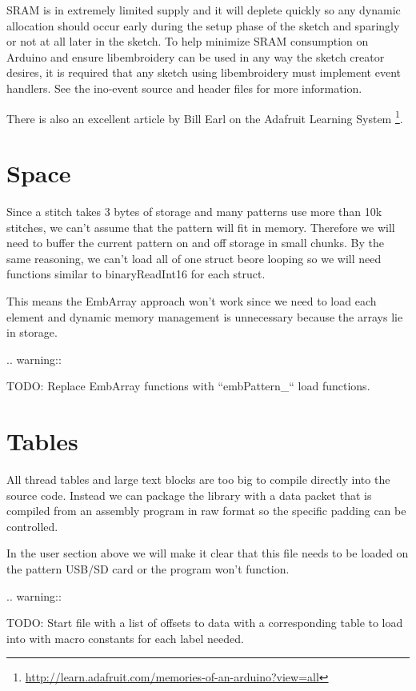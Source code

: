 \documentclass[11pt]{report}
\begin{document}
SRAM is in extremely limited supply and it will deplete quickly so any
dynamic allocation should occur early during the setup phase of the
sketch and sparingly or not at all later in the sketch. To help minimize
SRAM consumption on Arduino and ensure libembroidery can be used in any
way the sketch creator desires, it is required that any sketch using
libembroidery must implement event handlers. See the ino-event source
and header files for more information.

There is also an excellent article by Bill Earl on the Adafruit Learning
System
\footnote{\url{http://learn.adafruit.com/memories-of-an-arduino?view=all}}.

\section{Space}

Since a stitch takes 3 bytes of storage and many patterns use more than
10k stitches, we can't assume that the pattern will fit in memory. Therefore
we will need to buffer the current pattern on and off storage in small
chunks. By the same reasoning, we can't load all of one struct beore
looping so we will need functions similar to binaryReadInt16 for each
struct.

This means the EmbArray approach won't work since we need to load
each element and dynamic memory management is unnecessary because
the arrays lie in storage.

.. warning::

   TODO: Replace EmbArray functions with ``embPattern\_`` load functions.

\section{Tables}

All thread tables and large text blocks are too big to compile directly
into the source code. Instead we can package the library with a data packet
that is compiled from an assembly program in raw format so the specific
padding can be controlled.

In the user section above we will make it clear that this file
needs to be loaded on the pattern USB/SD card or the program won't function.

.. warning::

   TODO: Start file with a list of offsets to data with a corresponding table
   to load into with macro constants for each label needed.
\end{document}
